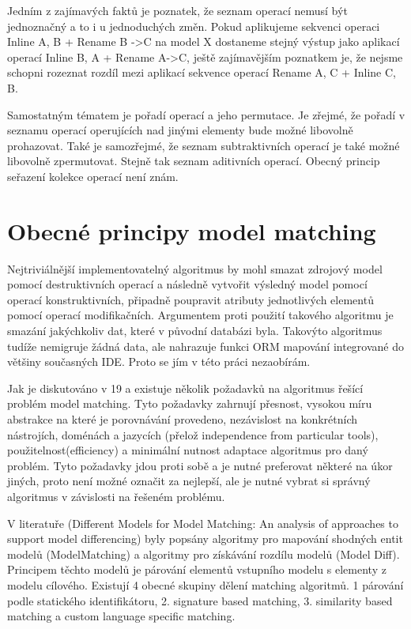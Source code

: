 \documentclass[11pt,twoside,a4paper]{book}
\begin{document}
Jedním z zajímavých faktů je poznatek, že seznam operací nemusí být jednoznačný
a to i u jednoduchých změn. Pokud aplikujeme sekvenci operaci Inline A, B + 
Rename B ->C na model X dostaneme stejný výstup jako aplikací operací Inline B,
A + Rename A->C, ještě zajímavějším poznatkem je, že nejsme schopni rozeznat
rozdíl mezi aplikací sekvence operací Rename A, C + Inline C, B.

Samostatným tématem je pořadí operací a jeho permutace. Je zřejmé, že pořadí v
seznamu operací operujících nad jinými elementy bude možné libovolně prohazovat.
Také je samozřejmé, že seznam subtraktivních operací je také možné libovolně
zpermutovat. Stejně tak seznam aditivních operací. Obecný princip seřazení kolekce 
operací není znám. 

\section{Obecné principy model matching}
Nejtriviálnější implementovatelný algoritmus by mohl smazat zdrojový model
pomocí destruktivních operací a následně vytvořit výsledný model pomocí operací
konstruktivních, připadně poupravit atributy jednotlivých elementů pomocí
operací modifikačních. Argumentem proti použití takového algoritmu je smazání
jakýchkoliv dat, které v původní databázi byla. Takovýto algoritmus tudíže
nemigruje žádná data, ale nahrazuje funkci ORM mapování integrované
do většiny současných IDE. Proto se jím v této práci nezaobírám.

Jak je diskutováno v 19 a \cite{Kolovos:Different_models} existuje několik
požadavků na algoritmus řešící problém model matching. Tyto požadavky zahrnují
přesnost, vysokou míru abstrakce na které je porovnávání provedeno, nezávislost
na konkrétních nástrojích, doménách a jazycích (přelož independence from
particular tools), použitelnost(efficiency) a minimální nutnost adaptace
algoritmus pro daný problém. Tyto požadavky jdou proti sobě a je nutné
preferovat některé na úkor jiných, proto není možné označit za nejlepší, ale je
nutné vybrat si správný algoritmus v závislosti na řešeném problému.

 V literatuře (Different Models for Model Matching:
An analysis of approaches to support model differencing) byly popsány algoritmy
pro mapování shodných entit modelů (ModelMatching) a algoritmy pro získávání
rozdílu modelů (Model Diff). 
 Principem těchto modelů je párování elementů vstupního modelu s elementy z
 modelu cílového. Existují 4 obecné skupiny dělení matching algoritmů. 1
 párování podle statického identifikátoru, 2. signature based matching, 3.
 similarity based matching a custom language specific matching.
 
\end{document}
